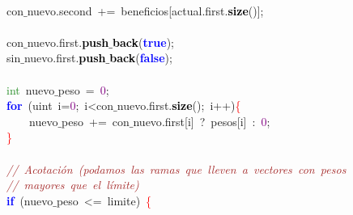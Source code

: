 \mbox{} \\
\mbox{}\ \ \ \ \ \ \ \ \ \ \ \ con$\_$nuevo\textcolor{BrickRed}{.}second\ \textcolor{BrickRed}{+=}\ beneficios\textcolor{BrickRed}{[}actual\textcolor{BrickRed}{.}first\textcolor{BrickRed}{.}\textbf{\textcolor{Black}{size}}\textcolor{BrickRed}{()];} \\
\mbox{} \\
\mbox{}\ \ \ \ \ \ \ \ \ \ \ \ con$\_$nuevo\textcolor{BrickRed}{.}first\textcolor{BrickRed}{.}\textbf{\textcolor{Black}{push$\_$back}}\textcolor{BrickRed}{(}\textbf{\textcolor{Blue}{true}}\textcolor{BrickRed}{);} \\
\mbox{}\ \ \ \ \ \ \ \ \ \ \ \ sin$\_$nuevo\textcolor{BrickRed}{.}first\textcolor{BrickRed}{.}\textbf{\textcolor{Black}{push$\_$back}}\textcolor{BrickRed}{(}\textbf{\textcolor{Blue}{false}}\textcolor{BrickRed}{);} \\
\mbox{} \\
\mbox{}\ \ \ \ \ \ \ \ \ \ \ \ \textcolor{ForestGreen}{int}\ nuevo$\_$peso\ \textcolor{BrickRed}{=}\ \textcolor{Purple}{0}\textcolor{BrickRed}{;} \\
\mbox{}\ \ \ \ \ \ \ \ \ \ \ \ \textbf{\textcolor{Blue}{for}}\ \textcolor{BrickRed}{(}\textcolor{TealBlue}{uint}\ i\textcolor{BrickRed}{=}\textcolor{Purple}{0}\textcolor{BrickRed}{;}\ i\textcolor{BrickRed}{\textless{}}con$\_$nuevo\textcolor{BrickRed}{.}first\textcolor{BrickRed}{.}\textbf{\textcolor{Black}{size}}\textcolor{BrickRed}{();}\ i\textcolor{BrickRed}{++)}\textcolor{Red}{\{} \\
\mbox{}\ \ \ \ \ \ \ \ \ \ \ \ \ \ \ \ nuevo$\_$peso\ \textcolor{BrickRed}{+=}\ con$\_$nuevo\textcolor{BrickRed}{.}first\textcolor{BrickRed}{[}i\textcolor{BrickRed}{]}\ \textcolor{BrickRed}{?}\ pesos\textcolor{BrickRed}{[}i\textcolor{BrickRed}{]}\ \textcolor{BrickRed}{:}\ \textcolor{Purple}{0}\textcolor{BrickRed}{;} \\
\mbox{}\ \ \ \ \ \ \ \ \ \ \ \ \textcolor{Red}{\}} \\
\mbox{} \\
\mbox{}\ \ \ \ \ \ \ \ \ \ \ \ \textit{\textcolor{Brown}{//\ Acotación\ (podamos\ las\ ramas\ que\ lleven\ a\ vectores\ con\ pesos}} \\
\mbox{}\ \ \ \ \ \ \ \ \ \ \ \ \textit{\textcolor{Brown}{//\ mayores\ que\ el\ límite)}} \\
\mbox{}\ \ \ \ \ \ \ \ \ \ \ \ \textbf{\textcolor{Blue}{if}}\ \textcolor{BrickRed}{(}nuevo$\_$peso\ \textcolor{BrickRed}{\textless{}=}\ limite\textcolor{BrickRed}{)}\ \textcolor{Red}{\{} \\
